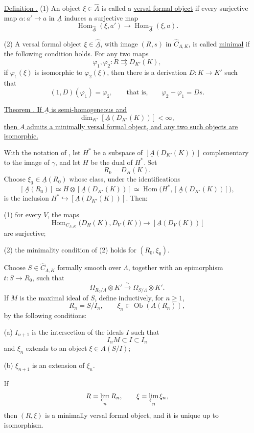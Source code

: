 
\underline{Definition .} (1) An object
$\xi\in\widehat{\underline A}$ is called a \underline{versal formal
object} if every surjective map $\alpha:a'\longrightarrow a$ in
$\underline A$ induces a surjective map
\[
 \operatorname{Hom}_{\widehat{\underline A}}(\xi,a')
 \longrightarrow
 \operatorname{Hom}_{\widehat{\underline A}}(\xi,a).
\]

(2) A versal formal object $\xi\in\widehat{\underline A}$, with
image $(R,s)$ in $\widehat C_{\Lambda,K}$, is called
\underline{minimal} if the following condition holds. For any two
maps
\[
 \varphi_1,\varphi_2:R\rightrightarrows D_{K'}(K),
\]
if $\varphi_1(\xi)$ is isomorphic to $\varphi_2(\xi)$, then there is
a derivation $D:K\longrightarrow K'$ such that
\[
 (1,D)(\varphi_1)=\varphi_2,
 \qquad\text{that is,}\qquad
 \varphi_2-\varphi_1=Ds.
\]

\underline{Theorem . If $\underline A$ is semi-homogeneous and}
\[
 \dim_{K'}[\underline A(D_{K'}(K))]<\infty,
\]
\underline{then $\underline A$ admits a minimally versal formal
object, and any two such objects are isomorphic.}


With the notation of , let $H^*$ be a subspace of
$[\underline A(D_{K'}(K))]$ complementary to the image of $\gamma$,
and let $H$ be the dual of $H^*$. Set
\[
 R_0=D_H(K).
\]
Choose $\xi_0\in\underline A(R_0)$ whose class, under the
identifications
\[
 [\underline A(R_0)]
 \simeq H\otimes[\underline A(D_{K'}(K))]
 \simeq
 \operatorname{Hom}\bigl(H^*,[\underline A(D_{K'}(K))]\bigr),
\]
is the inclusion
$H^*\hookrightarrow[\underline A(D_{K'}(K))]$. Then:

(1) for every $V$, the maps
\[
 \operatorname{Hom}_{C_{\Lambda,K}}
   \bigl(D_H(K),D_V(K)\bigr)
 \longrightarrow[\underline A(D_V(K))]
\]
are surjective;

(2) the minimality condition of (2) holds for
$(R_0,\xi_0)$.

Choose $S\in\widehat C_{\Lambda,K}$ formally smooth over $\Lambda$,
together with an epimorphism $t:S\longrightarrow R_0$, such that
\[
 \Omega_{R_0/\Lambda}\otimes K'
 \xrightarrow{\ \sim\ }
 \Omega_{S/\Lambda}\otimes K'.
\]
If $M$ is the maximal ideal of $S$, define inductively, for
$n\geq1$,
\[
 R_n=S/I_n,
 \qquad
 \xi_n\in\operatorname{Ob}(\underline A(R_n)),
\]
by the following conditions:

(a) $I_{n+1}$ is the intersection of the ideals $I$ such that
\[
 I_nM\subset I\subset I_n
\]
and $\xi_n$ extends to an object $\xi\in\underline A(S/I)$;

(b) $\xi_{n+1}$ is an extension of $\xi_n$.

If
\[
 R=\varprojlim_nR_n,
 \qquad
 \xi=\varprojlim_n\xi_n,
\]
then $(R,\xi)$ is a minimally versal formal object, and it is unique
up to isomorphism.

